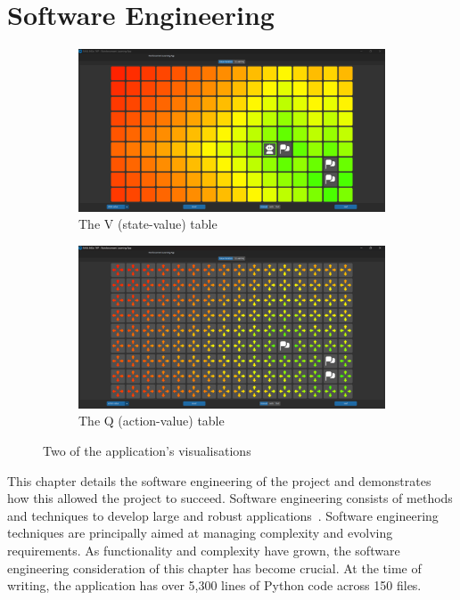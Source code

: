 \documentclass[]{final_report}
\begin{document}
\chapter{Software Engineering}
\label{chap:software-engineering}
\begin{figure}[H]
  \centering
  \begin{subfigure}{.5\textwidth}
    \centering
    \includegraphics[width=0.95\linewidth]{state_value}
    \caption[width=0.5\linewidth]{\label{fig:screenshot:state-value-table} The V (state-value) table}
  \end{subfigure}%
  \begin{subfigure}{.5\textwidth}
    \centering
    \includegraphics[width=0.95\linewidth]{action_value}
    \caption[width=0.5\linewidth]{\label{fig:screenshot:action-value-table} The Q (action-value) table}
  \end{subfigure}
  \caption{Two of the application's visualisations}
  \label{fig:app-ui}
\end{figure}

This chapter details the software engineering of the project and demonstrates how this allowed the project to succeed. Software engineering consists of methods and techniques to develop large and robust applications~\cite{van2008software}. Software engineering techniques are principally aimed at managing complexity and evolving requirements. As functionality and complexity have grown, the software engineering consideration of this chapter has become crucial. At the time of writing, the application has over 5,300 lines of Python code across 150 files.
\end{document}
